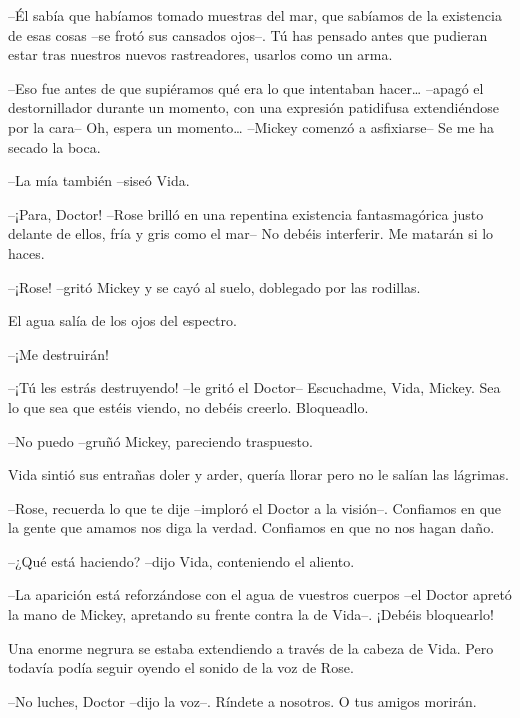 {--Él sabía que habíamos tomado muestras del mar, que sabíamos de la
 existencia de esas cosas --se frotó sus cansados ojos--. Tú has pensado
 antes que pudieran estar tras nuestros nuevos rastreadores, usarlos como
un arma.}

{--Eso fue antes de que supiéramos qué era lo que intentaban
 hacer\ldots{} --apagó el destornillador durante un momento, con una
 expresión patidifusa extendiéndose por la cara-- Oh, espera un
 momento\ldots{} --Mickey comenzó a asfixiarse-- Se me ha secado la
boca.}

{--La mía también --siseó Vida.}

{--¡Para, Doctor! --Rose brilló en una repentina existencia
 fantasmagórica justo delante de ellos, fría y gris como el mar-- No
debéis interferir. Me matarán si lo haces.}

{--¡Rose! --gritó Mickey y se cayó al suelo, doblegado por las
rodillas.}

{El agua salía de los ojos del espectro.}

{--¡Me destruirán!}

{--¡Tú les estrás destruyendo! --le gritó el Doctor-- Escuchadme, Vida,
 Mickey. Sea lo que sea que estéis viendo, no debéis creerlo.
Bloqueadlo.}

{--No puedo --gruñó Mickey, pareciendo traspuesto.}

{Vida sintió sus entrañas doler y arder, quería llorar pero no le salían
las lágrimas.}

{--Rose, recuerda lo que te dije --imploró el Doctor a la visión--.
 Confiamos en que la gente que amamos nos diga la verdad. Confiamos en
que no nos hagan daño.}

{--¿Qué está haciendo? --dijo Vida, conteniendo el aliento.}

{--La aparición está reforzándose con el agua de vuestros cuerpos --el
 Doctor apretó la mano de Mickey, apretando su frente contra la de
Vida--. ¡Debéis bloquearlo!}

{Una enorme negrura se estaba extendiendo a través de la cabeza de Vida.
Pero todavía podía seguir oyendo el sonido de la voz de Rose.}

{--No luches, Doctor --dijo la voz--. Ríndete a nosotros. O tus amigos
morirán.}
